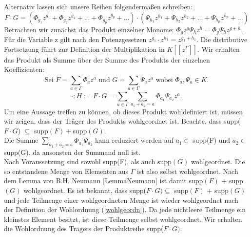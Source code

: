 Alternativ lassen sich unsere Reihen folgendermaßen schreiben: 
\[ F\cdot G = \left(\Phi_{g_1}z^{g_1} + \Phi_{g_2}z^{g_2} + ... + \Phi_{g_p}z^{g_p} + ...\right) \cdot \left( \Psi_{h_1}z^{h_1} + \Psi_{h_2}z^{h_2} + ... + \Psi_{h_p}z^{h_p} + ...\right)\]
Betrachten wir zunächst das Produkt einzelner Monome: $\Phi_gz^g  \Psi_hz^h = \Phi_g  \Psi_h z^{g+h} $. Für die Variable z gilt nach den Potenzgesetzen $z^{g_1} \cdot z^{h_1} = z^{g_1 + h_1}$. Die distributive Fortsetzung führt zur Definition der Multiplikation in $K[[z^{\Gamma}]]$. Wir erhalten das Produkt als Summe über der Summe des Produkts der einzelnen Koeffizienten: 
\[ \text{Sei } F = \sum_{a \in \Gamma}^{} \Phi_a z^a \text{ und } G = \sum_{a \in \Gamma}^{} \Psi_a z^a \text{ wobei } \Phi_a, \Psi_a \in K. \]
\begin{equation}\label{eq: multPotenzreihenkoerper}  
\cdot: H:= F \cdot G = \sum_{a \in \Gamma}^{}\sum_{a_1 + a_2 = a}^{}\Phi_{a_1} \Psi_{a_2}z^a.  
\end{equation}                         
Um eine Aussage treffen zu können, ob dieses Produkt wohldefiniert ist, müssen wir zeigen, dass der Träger des Produkts wohlgeordnet ist. Beachte, dass supp($F\cdot G$) $\subseteq$ supp$(F)+ $supp$(G)$. \\ 
Die Summe $\sum_{a_1 + a_2 = a}^{}\Phi_{a_1} \Psi_{a_2}$ kann reduziert werden auf $a_1\in$ supp(F) und $a_2\in$ supp(G), da ansonsten der Summand null ist. \\
Nach Voraussetzung sind sowohl supp(F), als auch supp$(G)$ wohlgeordnet. Die so entstandene Menge von Elementen aus $\Gamma$ ist also selbst wohlgeordnet. Nach dem Lemma von B.H. Neumann \ref{LemmaNeumann} ist damit supp$(F)$ + supp$(G)$ wohlgeordnet. Es ist bekannt, dass supp($F\cdot G) \subseteq$ supp$(F)$ + supp$(G)$ und jede Teilmenge einer wohlgeordneten Menge ist wieder wohlgeordnet nach der Definition der Wohlordnung (\ref{wohlgeordn}). Da jede nichtleere Teilmenge ein kleinstes Element besitzt, ist diese Teilmenge selbst wohlgeordnet. Wir erhalten die Wohlordnung des Trägers der Produktreihe supp($F\cdot G)$.

